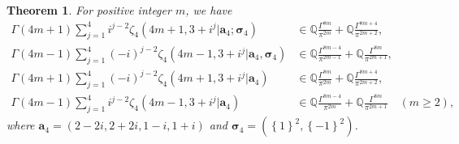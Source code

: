 \documentclass[11pt]{article}
\theoremstyle{plain}
\newtheorem{thm}{Theorem}[section]
\theoremstyle{definition}
\begin{document}
\begin{thm}\label{GBZeta} For positive integer $m$, we have
\begin{align*}
\Gamma \left( 4m+1 \right)\sum_{j=1}^4{i  ^{j-2}\zeta _4\left( 4m+1,3+i^j|\mathbf{a}_4;\boldsymbol{\sigma }_4 \right)}&\in \mathbb{Q} \frac{\Gamma ^{8m}}{\pi ^{2m}}+\mathbb{Q} \frac{\Gamma ^{8m+4}}{\pi ^{2m+2}},
    			\\
\Gamma \left( 4m-1 \right) \sum_{j=1}^4{\left( -i \right) ^{j-2}}\zeta _4\left( 4m-1,3+i^j|\mathbf{a}_4,\boldsymbol{\sigma }_4 \right) &\in \mathbb{Q} \frac{\Gamma ^{8m-4}}{\pi ^{2m-1}}+\mathbb{Q} \frac{\Gamma ^{8m}}{\pi ^{2m+1}},
    			\\
\Gamma \left( 4m+1 \right) \sum_{j=1}^4{\left( -i \right) ^{j-2}}\zeta _4(4m+1,3+i^j|\mathbf{a}_4)&\in \mathbb{Q} \frac{\Gamma ^{8m}}{\pi ^{2m}}+\mathbb{Q} \frac{\Gamma ^{8m+4}}{\pi ^{2m+2}},
    			\\
\Gamma \left( 4m-1 \right)\sum_{j=1}^4{i  ^{j-2}\zeta _4\left( 4m-1,3+i^j|\mathbf{a}_4 \right)}&\in \mathbb{Q} \frac{\Gamma ^{8m-4}}{\pi ^{2m}}+\mathbb{Q} \frac{\Gamma ^{8m}}{\pi ^{2m+1}}\quad (m\ge 2),
\end{align*}
where $\mathbf{a}_4=\left( 2-2i,2+2i,1-i,1+i \right) $ and $\boldsymbol{\sigma }_4=\left( \left\{ 1 \right\}^2,\left\{ -1 \right\}^2 \right)$.
\end{thm}
\end{document}
